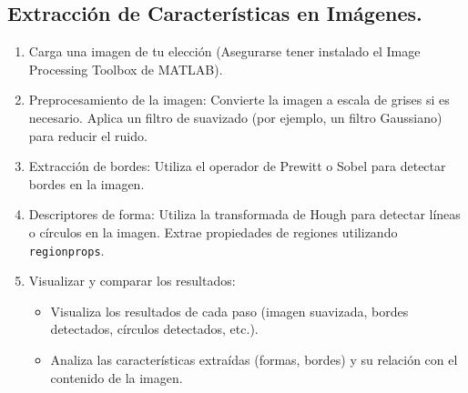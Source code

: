 \subsection{Extracción de Características en Imágenes.}

\begin{enumerate}
    \item Carga una imagen de tu elección (Asegurarse tener instalado el Image Processing Toolbox de MATLAB).
    \item Preprocesamiento de la imagen: Convierte la imagen a escala de grises si es necesario. Aplica un filtro de suavizado (por ejemplo, un filtro Gaussiano) para reducir el ruido.
    \item Extracción de bordes: Utiliza el operador de Prewitt o Sobel para detectar bordes en la imagen.
    \item Descriptores de forma: Utiliza la transformada de Hough para detectar líneas o círculos en la imagen. Extrae propiedades de regiones utilizando \texttt{regionprops}.
    \item Visualizar y comparar los resultados:
    \begin{itemize}
        \item Visualiza los resultados de cada paso (imagen suavizada, bordes detectados, círculos detectados, etc.).
        \item Analiza las características extraídas (formas, bordes) y su relación con el contenido de la imagen.
    \end{itemize}
\end{enumerate}